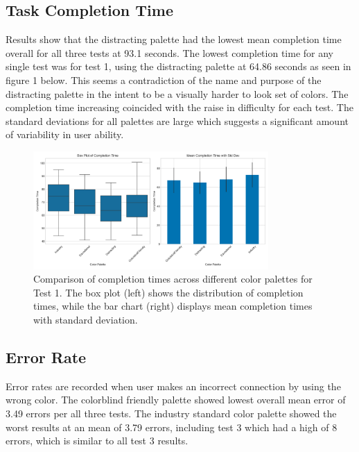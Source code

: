 \documentclass[acmlarge]{acmart}
\begin{document}
\subsection{Task Completion Time}
Results show that the distracting palette had the lowest mean completion time overall for all three tests at 93.1 seconds. The lowest completion time for any single test was for test 1, using the distracting palette at 64.86 seconds as seen in figure 1 below. This seems a contradiction of the name and purpose of the distracting palette in the intent to be a visually harder to look set of colors. The completion time increasing coincided with the raise in difficulty for each test. The standard deviations for all palettes are large which suggests a significant amount of variability in user ability.

\begin{figure} [H]
  \centering
  \includegraphics[width=0.8\textwidth]{completion_time_test1_analysis_20250504_061112.png}
  \caption{Comparison of completion times across different color palettes for Test 1. The box plot (left) shows the distribution of completion times, while the bar chart (right) displays mean completion times with standard deviation.}
  \label{fig:completion-time-test1}
\end{figure}

\subsection{Error Rate}
Error rates are recorded when user makes an incorrect connection by using the wrong color. The colorblind friendly palette showed lowest overall mean error of 3.49 errors per all three tests. The industry standard color palette showed the worst results at an mean of 3.79 errors, including test 3 which had a high of 8 errors, which is similar to all test 3 results.
\end{document}
